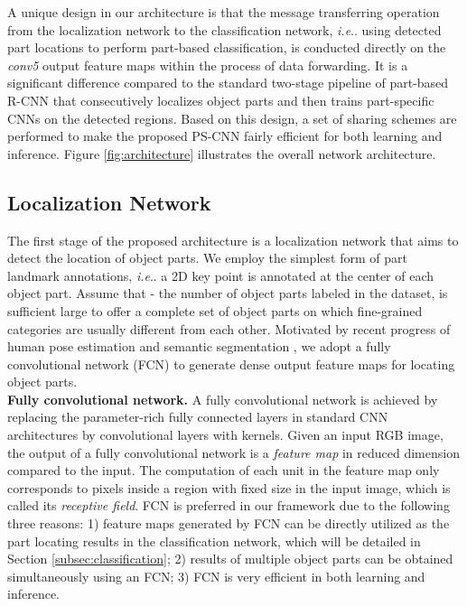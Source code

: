 \documentclass[10pt,twocolumn,letterpaper]{article}
\makeatletter
\DeclareRobustCommand\onedot{\futurelet\@let@token\@onedot}
\def\@onedot{\ifx\@let@token.\else.\null\fi\xspace}
\def\ie{\emph{i.e}\onedot} \def\Ie{\emph{I.e}\onedot}
\makeatother
\begin{document}
A unique design in our architecture is that the message transferring operation from the localization network to the classification network, \ie using detected part locations to perform part-based classification, is conducted directly on the \textit{conv5} output feature maps within the process of data forwarding. It is a significant difference compared to the standard two-stage pipeline of part-based R-CNN \cite{zhang2014part} that consecutively localizes object parts and then trains part-specific CNNs on the detected regions. Based on this design, a set of sharing schemes are performed to make the proposed PS-CNN fairly efficient for both learning and inference. Figure \ref{fig:architecture} illustrates the overall network architecture.








\subsection{Localization Network} \label{subsec:localization}
The first stage of the proposed architecture is a localization network that aims to detect the location of object parts. We employ the simplest form of part landmark annotations, \ie a 2D key point is annotated at the center of each object part. Assume that  - the number of object parts labeled in the dataset, is sufficient large to offer a complete set of object parts on which fine-grained categories are usually different from each other.
Motivated by recent progress of human pose estimation \cite{long2015fully} and semantic segmentation \cite{tompson2014joint}, we adopt a fully convolutional network (FCN) \cite{matan1995multi} to generate dense output feature maps for locating object parts.\\



\noindent\textbf{Fully convolutional network.}
A fully convolutional network is achieved by replacing the parameter-rich fully connected layers in standard CNN architectures by convolutional layers with  kernels. Given an input RGB image, the output of a fully convolutional network is a \textit{feature map} in reduced dimension compared to the input. The computation of each unit in the feature map only corresponds to pixels inside a region with fixed size in the input image, which is called its \textit{receptive field}.
FCN is preferred in our framework due to the following three reasons: 1) feature maps generated by FCN can be directly utilized as the part locating results in the classification network, which will be detailed in Section \ref{subsec:classification}; 2) results of multiple object parts can be obtained simultaneously using an FCN; 3) FCN is very efficient in both learning and inference. \\
\end{document}

